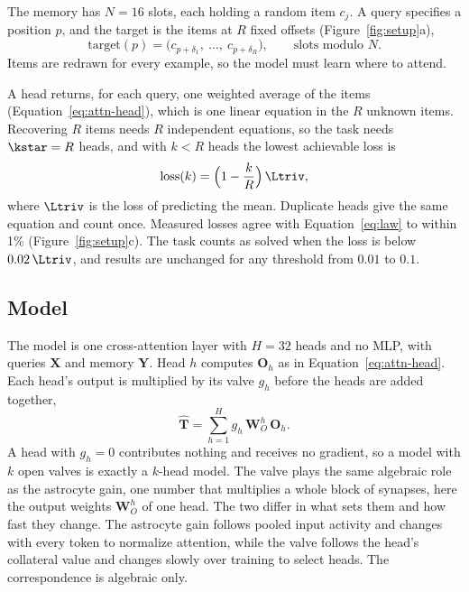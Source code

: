 The memory has $N = 16$ slots, each holding a random item $c_j$. A query specifies a position $p$, and the target is the items at $R$ fixed offsets (Figure~\ref{fig:setup}a),
\begin{equation}
  \text{target}(p) = \big(c_{p+\delta_1},\ \dots,\ c_{p+\delta_R}\big),
  \qquad \text{slots modulo } N.
\end{equation}
Items are redrawn for every example, so the model must learn where to attend.

A head returns, for each query, one weighted average of the items (Equation~\eqref{eq:attn-head}), which is one linear equation in the $R$ unknown items. Recovering $R$ items needs $R$ independent equations, so the task needs $\kstar = R$ heads, and with $k < R$ heads the lowest achievable loss is
\begin{equation}
  \text{loss}(k) = \Big(1 - \frac{k}{R}\Big)\, \Ltriv,
  \label{eq:law}
\end{equation}
where $\Ltriv$ is the loss of predicting the mean. Duplicate heads give the same equation and count once. Measured losses agree with Equation~\eqref{eq:law} to within 1\% (Figure~\ref{fig:setup}c). The task counts as solved when the loss is below $0.02\,\Ltriv$, and results are unchanged for any threshold from $0.01$ to $0.1$.

\subsection{Model}

The model is one cross-attention layer with $H = 32$ heads and no MLP, with queries $\bm X$ and memory $\bm Y$. Head $h$ computes $\bm O_h$ as in Equation~\eqref{eq:attn-head}. Each head's output is multiplied by its valve $g_h$ before the heads are added together,
\begin{equation}
  \hat{\bm T} = \sum_{h=1}^{H} g_h\, \bm W_O^h\, \bm O_h .
  \label{eq:valve}
\end{equation}
A head with $g_h = 0$ contributes nothing and receives no gradient, so a model with $k$ open valves is exactly a $k$-head model. The valve plays the same algebraic role as the astrocyte gain, one number that multiplies a whole block of synapses, here the output weights $\bm W_O^h$ of one head. The two differ in what sets them and how fast they change. The astrocyte gain follows pooled input activity and changes with every token to normalize attention, while the valve follows the head's collateral value and changes slowly over training to select heads. The correspondence is algebraic only.

